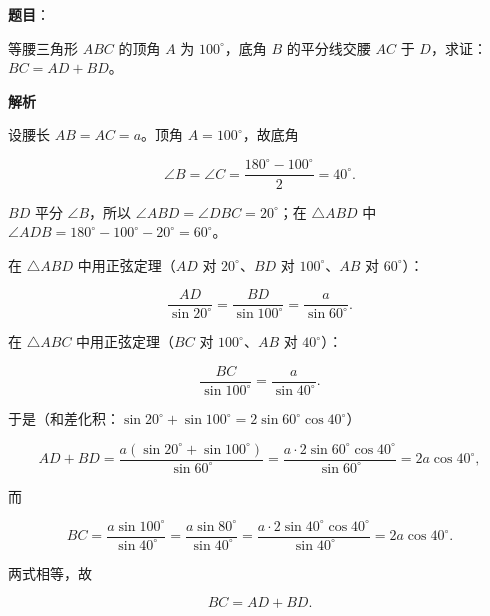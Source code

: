 \begin{answer}

\textbf{题目}：

等腰三角形 $ABC$ 的顶角 $A$ 为 $100^\circ$，底角 $B$ 的平分线交腰 $AC$ 于 $D$，求证：$BC=AD+BD$。

\textbf{解析}

设腰长 $AB=AC=a$。顶角 $A=100^\circ$，故底角

\nopagebreak[4]
\[
\angle B=\angle C=\frac{180^\circ-100^\circ}{2}=40^\circ.
\]

$BD$ 平分 $\angle B$，所以 $\angle ABD=\angle DBC=20^\circ$；在 $\triangle ABD$ 中 $\angle ADB=180^\circ-100^\circ-20^\circ=60^\circ$。

在 $\triangle ABD$ 中用正弦定理（$AD$ 对 $20^\circ$、$BD$ 对 $100^\circ$、$AB$ 对 $60^\circ$）：

\nopagebreak[4]
\[
\frac{AD}{\sin20^\circ}=\frac{BD}{\sin100^\circ}=\frac{a}{\sin60^\circ}.
\]

在 $\triangle ABC$ 中用正弦定理（$BC$ 对 $100^\circ$、$AB$ 对 $40^\circ$）：

\nopagebreak[4]
\[
\frac{BC}{\sin100^\circ}=\frac{a}{\sin40^\circ}.
\]

于是（和差化积：$\sin20^\circ+\sin100^\circ=2\sin60^\circ\cos40^\circ$）

\nopagebreak[4]
\[
AD+BD
=\frac{a(\sin20^\circ+\sin100^\circ)}{\sin60^\circ}
=\frac{a\cdot2\sin60^\circ\cos40^\circ}{\sin60^\circ}
=2a\cos40^\circ,
\]

而

\nopagebreak[4]
\[
BC=\frac{a\sin100^\circ}{\sin40^\circ}
=\frac{a\sin80^\circ}{\sin40^\circ}
=\frac{a\cdot2\sin40^\circ\cos40^\circ}{\sin40^\circ}
=2a\cos40^\circ.
\]

两式相等，故

\nopagebreak[4]
\[
BC=AD+BD.
\]


\end{answer}